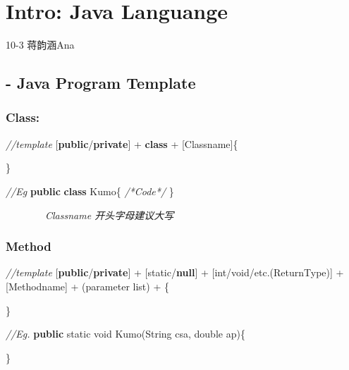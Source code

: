 \documentclass[
  paper=a4,
  ,captions=tableheading
]{scrartcl}
\author{}
\date{}
\title{}
\author{}
\date{}
\newenvironment{Shaded}{}{}
\newcommand{\BuiltInTok}[1]{#1}
\newcommand{\CommentTok}[1]{\textcolor[rgb]{0.38,0.63,0.69}{\textit{#1}}}
\newcommand{\DataTypeTok}[1]{\textcolor[rgb]{0.56,0.13,0.00}{#1}}
\newcommand{\FunctionTok}[1]{\textcolor[rgb]{0.02,0.16,0.49}{#1}}
\newcommand{\KeywordTok}[1]{\textcolor[rgb]{0.00,0.44,0.13}{\textbf{#1}}}
\newcommand{\NormalTok}[1]{#1}
\begin{document}




\hypertarget{intro-java-languange}{%
\section{Intro: Java Languange}\label{intro-java-languange}}

10-3 蒋韵涵Ana

\hypertarget{java-program-template}{%
\subsection{- Java Program Template}\label{java-program-template}}

\hypertarget{class}{%
\subsubsection{Class:}\label{class}}

\begin{Shaded}
\begin{Highlighting}[]
\CommentTok{//template}
\NormalTok{[}\KeywordTok{public}\NormalTok{/}\KeywordTok{private}\NormalTok{] + }\KeywordTok{class}\NormalTok{ + [Classname]\{ }

\NormalTok{\}}

\CommentTok{//Eg}
\KeywordTok{public} \KeywordTok{class}\NormalTok{ Kumo\{}
    \CommentTok{/*Code*/}
\NormalTok{\}}
\end{Highlighting}
\end{Shaded}

~~~~~~~~\emph{Classname 开头字母建议大写}

\hypertarget{method}{%
\subsubsection{Method}\label{method}}

\begin{Shaded}
\begin{Highlighting}[]
\CommentTok{//template}
\NormalTok{[}\KeywordTok{public}\NormalTok{/}\KeywordTok{private}\NormalTok{] + [}\DataTypeTok{static}\NormalTok{/}\KeywordTok{null}\NormalTok{] + [}\DataTypeTok{int}\NormalTok{/}\DataTypeTok{void}\NormalTok{/etc.(ReturnType)] }
\NormalTok{    + [Methodname] + (parameter list) + \{}

\NormalTok{ \}}

\CommentTok{//Eg.}
\KeywordTok{public} \DataTypeTok{static} \DataTypeTok{void} \FunctionTok{Kumo}\NormalTok{(}\BuiltInTok{String}\NormalTok{ csa, }\DataTypeTok{double}\NormalTok{ ap)\{}

\NormalTok{\}}
\end{Highlighting}
\end{Shaded}
\end{document}
